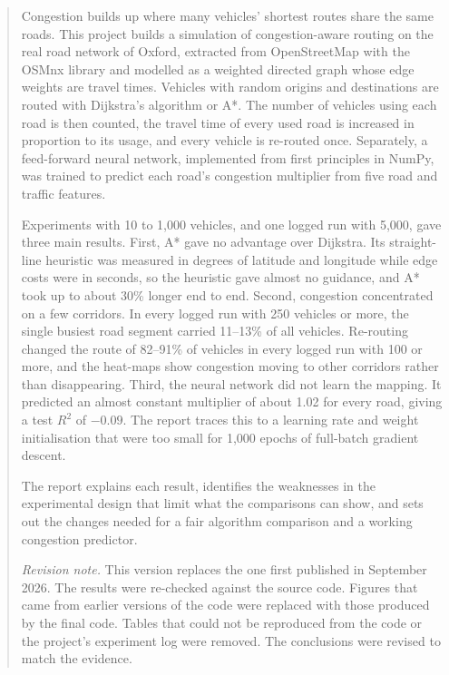 \documentclass[12pt]{report}
\begin{document}
\begin{abstract}

Congestion builds up where many vehicles' shortest routes share the same roads. This project builds a simulation of congestion-aware routing on the real road network of Oxford, extracted from OpenStreetMap with the OSMnx library and modelled as a weighted directed graph whose edge weights are travel times. Vehicles with random origins and destinations are routed with Dijkstra's algorithm or A*. The number of vehicles using each road is then counted, the travel time of every used road is increased in proportion to its usage, and every vehicle is re-routed once. Separately, a feed-forward neural network, implemented from first principles in NumPy, was trained to predict each road's congestion multiplier from five road and traffic features.

Experiments with 10 to 1,000 vehicles, and one logged run with 5,000, gave three main results. First, A* gave no advantage over Dijkstra. Its straight-line heuristic was measured in degrees of latitude and longitude while edge costs were in seconds, so the heuristic gave almost no guidance, and A* took up to about 30\% longer end to end. Second, congestion concentrated on a few corridors. In every logged run with 250 vehicles or more, the single busiest road segment carried 11--13\% of all vehicles. Re-routing changed the route of 82--91\% of vehicles in every logged run with 100 or more, and the heat-maps show congestion moving to other corridors rather than disappearing. Third, the neural network did not learn the mapping. It predicted an almost constant multiplier of about 1.02 for every road, giving a test $R^2$ of $-0.09$. The report traces this to a learning rate and weight initialisation that were too small for 1,000 epochs of full-batch gradient descent.

The report explains each result, identifies the weaknesses in the experimental design that limit what the comparisons can show, and sets out the changes needed for a fair algorithm comparison and a working congestion predictor.

\vspace{1em}
\noindent\small\textit{Revision note.} This version replaces the one first published in September 2026. The results were re-checked against the source code. Figures that came from earlier versions of the code were replaced with those produced by the final code. Tables that could not be reproduced from the code or the project's experiment log were removed. The conclusions were revised to match the evidence.
\end{abstract}
\end{document}
